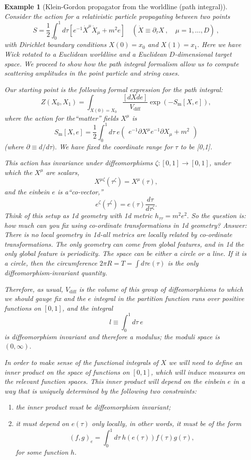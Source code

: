 \documentclass[10pt,
 article,
 amsmath,amssymb
]{revtex4-2}
\newtheorem{example}[theorem]{Example}
\begin{document}
\begin{example}[Klein-Gordon propagator from the worldline (path integral)]

Consider the action for a relativistic particle propagating between two points
$$S=\frac{1}{2}\int_0^1d\tau\left[e^{-1}\dot{X}^\mu\dot{X}_\mu+m^2e\right]\quad(\dot{X}\equiv\partial_\tau X\:,\quad\mu=1,\ldots,D)\:,$$
with Dirichlet boundary conditions $X(0)=x_0$ and $X(1)=x_1.$ Here we have Wick rotated to a
Euclidean worldline and a Euclidean $D$-dimensional target space. We proceed to show how the path integral formalism allow us to compute scattering amplitudes in the point particle and string cases.


Our starting point is the following formal expression for the path integral:
$$Z(X_0,X_1)=\int_{X(0)=X_0}\frac{[dXde]}{V_{\mathrm{diff}}}\exp\left(-S_{\mathrm{m}}[X,e]\right),$$
where the action for the“matter” fields $X^\mu$ is
$$S_\text{m}[X,e]=\dfrac{1}{2}\int_0^1d\tau\:e\begin{pmatrix}e^{-1}\partial X^\mu e^{-1}\partial X_\mu+m^2\end{pmatrix}$$
(where $\partial\equiv d/d\tau).$ We have fixed the coordinate range for $\tau$ to be [0,1]. 

This action has invariance under diffeomorphisms
$\zeta:[0,1]\to[0,1]$, under which the $X^\mu$ are scalars,
$$X^{\mu\zeta}(\tau^\zeta)=X^\mu(\tau),$$
and the einbein $e$ is a“co-vector,”
$$e^\zeta(\tau^\zeta)=e(\tau)\frac{d\tau}{d\tau^\zeta}.$$ 
Think of this setup as 1d geometry with 1d metric $h_{\tau\tau}=m^2e^2.$ So the question is: how
much can you fix using co-ordinate transformations in 1d geometry?
Answer: There is no local geometry in 1d-all metrics are locally related by co-ordinate transformations. 
The only geometry can come from global features, and in 1d the only global feature is periodicity. 
The space can be either a circle or a line. If it is a circle, 
then the circumference $2\pi R=T=\int d\tau e(\tau)$ is the only diffeomorphism-invariant quantity.


Therefore, as usual, $V_\mathrm{diff}$ is the volume of this group of diffeomorphisms to which we should gauge fix and the $e$ integral
in the partition function runs over positive functions on $[0,1]$, and the integral
$$l\equiv\int_0^1d\tau\:e$$
is diffeomorphism invariant and therefore a modulus; the moduli space is $(0,\infty).$


In order to make sense of the functional integrals of $X$ we will need to define an inner 
product on the space of functions on $[0,1]$, which will induce measures on the relevant 
function spaces. This inner product will depend on the einbein $e$ in a way that is
 uniquely determined by the following two constraints:
 \begin{enumerate}
    \item the inner product must be 
    diffeomorphism invariant; 
    \item it must depend on $e(\tau)$ only locally, in other words,
     it must be of the form $$(f,g)_e=\int_0^1d\tau\:h(e(\tau))f(\tau)g(\tau),$$ for some function $h.$ 
 \end{enumerate}


\end{example}
\end{document}

